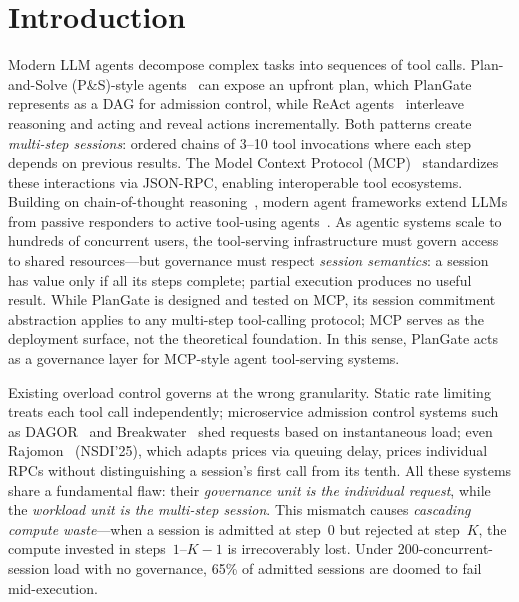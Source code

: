 \documentclass[sigconf,review,anonymous]{acmart}
\begin{document}
\maketitle

\section{Introduction}

Modern LLM agents decompose complex tasks into sequences of tool calls. Plan-and-Solve (P\&S)-style agents~\cite{planandsolve} can expose an upfront plan, which PlanGate represents as a DAG for admission control, while ReAct agents~\cite{react} interleave reasoning and acting and reveal actions incrementally. Both patterns create \emph{multi-step sessions}: ordered chains of 3--10 tool invocations where each step depends on previous results. The Model Context Protocol (MCP)~\cite{mcp2024} standardizes these interactions via JSON-RPC, enabling interoperable tool ecosystems. Building on chain-of-thought reasoning~\cite{cot}, modern agent frameworks extend LLMs from passive responders to active tool-using agents~\cite{llmsurvey}. As agentic systems scale to hundreds of concurrent users, the tool-serving infrastructure must govern access to shared resources---but governance must respect \emph{session semantics}: a session has value only if all its steps complete; partial execution produces no useful result. While PlanGate is designed and tested on MCP, its session commitment abstraction applies to any multi-step tool-calling protocol; MCP serves as the deployment surface, not the theoretical foundation. In this sense, PlanGate acts as a governance layer for MCP-style agent tool-serving systems.


Existing overload control governs at the wrong granularity. Static rate limiting treats each tool call independently; microservice admission control systems such as DAGOR~\cite{dagor} and Breakwater~\cite{breakwater} shed requests based on instantaneous load; even Rajomon~\cite{rajomon2025} (NSDI'25), which adapts prices via queuing delay, prices individual RPCs without distinguishing a session's first call from its tenth. All these systems share a fundamental flaw: their \emph{governance unit is the individual request}, while the \emph{workload unit is the multi-step session}. This mismatch causes \emph{cascading compute waste}---when a session is admitted at step~0 but rejected at step~$K$, the compute invested in steps~$1$--$K{-}1$ is irrecoverably lost. Under 200-concurrent-session load with no governance, 65\% of admitted sessions are doomed to fail mid-execution.
\end{document}
